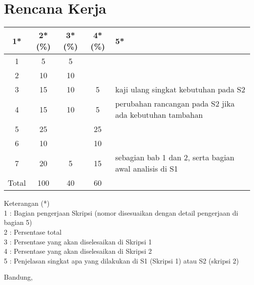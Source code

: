\documentclass[a4paper,twoside]{article}
\begin{document}
\section{Rencana Kerja}

\begin{center}
  \begin{tabular}{ | c | c | c | c | l |}
    \hline
    1*  & 2*(\%) & 3*(\%) & 4*(\%) &5*\\ \hline \hline
    1   & 5  & 5  &  &  \\ \hline
    2   & 10 & 10  &   & \\ \hline
    3   & 15  & 10  & 5 & {\footnotesize kaji ulang singkat kebutuhan pada S2}  \\ \hline
    4   & 15  & 10  & 5 & {\footnotesize perubahan rancangan pada S2 jika ada kebutuhan tambahan} \\ \hline
    5   & 25  &   & 25 & \\ \hline
    6   & 10 &   & 10  & \\ \hline
    7   & 20  & 5  & 15 &  {\footnotesize sebagian bab 1 dan 2, serta bagian awal analisis di S1}\\ \hline
    Total  & 100  & 40  & 60 &  \\ \hline
                          \end{tabular}
\end{center}

Keterangan (*)\\
1 : Bagian pengerjaan Skripsi (nomor disesuaikan dengan detail pengerjaan di bagian 5)\\
2 : Persentase total \\
3 : Persentase yang akan diselesaikan di Skripsi 1 \\
4 : Persentase yang akan diselesaikan di Skripsi 2 \\
5 : Penjelasan singkat apa yang dilakukan di S1 (Skripsi 1) atau S2 (skripsi 2)

\vspace{1cm}
\centering Bandung, \tanggal\\
\vspace{2cm} \nama \\ 
\vspace{1cm}
\end{document}
